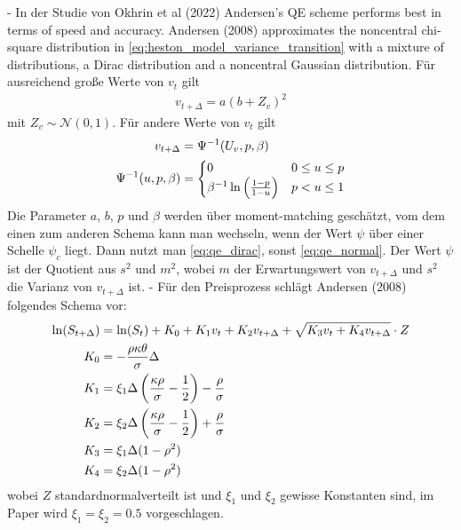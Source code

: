 - In der Studie von Okhrin et al (2022) Andersen's QE scheme performs best in terms of speed and accuracy. Andersen (2008) approximates the noncentral chi-square distribution in \eqref{eq:heston_model_variance_transition} with a mixture of distributions, a Dirac distribution and a noncentral Gaussian distribution. Für ausreichend große Werte von $v_t$ gilt
\begin{align}
    \label{eq:qe_normal}
    v_{t+\Delta} = a(b+Z_v)^2
\end{align}
mit $Z_v\sim\mathcal{N}(0,1)$. Für andere Werte von $v_t$ gilt
\begin{align}
    \label{eq:qe_dirac}
    v_{t+\Delta} &= \Psi^{-1}(U_v, p, \beta) \\
    \Psi^{-1}(u,p,\beta) &= \begin{cases}
        0 & 0\le u\le p \\
        \beta^{-1}\ln\left(\frac{1-p}{1-u}\right) & p<u\le 1
    \end{cases} \notag
\end{align}
Die Parameter $a$, $b$, $p$ und $\beta$ werden über moment-matching geschätzt, vom dem einen zum anderen Schema kann man wechseln, wenn der Wert $\psi$ über einer Schelle $\psi_c$ liegt. Dann nutzt man \eqref{eq:qe_dirac}, sonst \eqref{eq:qe_normal}. Der Wert $\psi$ ist der Quotient aus $s^2$ und $m^2$, wobei $m$ der Erwartungswert von $v_{t+\Delta}$ und $s^2$ die Varianz von $v_{t+\Delta}$ ist.
- Für den Preisprozess schlägt Andersen (2008) folgendes Schema vor:
\begin{align}
    \ln(S_{t+\Delta}) &= \ln(S_t) + K_0 + K_1v_t + K_2v_{t+\Delta} + \sqrt{K_3v_t + K_4v_{t+\Delta}}\cdot Z \notag \\
    K_0 &= -\frac{\rho\kappa\theta}{\sigma}\Delta \notag \\
    K_1 &= \xi_1\Delta\left(\frac{\kappa\rho}{\sigma} - \frac{1}{2}\right)-\frac{\rho}{\sigma} \notag \\
    K_2 &= \xi_2\Delta\left(\frac{\kappa\rho}{\sigma}-\frac{1}{2}\right)+\frac{\rho}{\sigma} \notag \\
    K_3 &= \xi_1\Delta(1-\rho^2) \notag \\
    K_4 &= \xi_2\Delta(1-\rho^2) \notag
\end{align}
wobei $Z$ standardnormalverteilt ist und $\xi_1$ und $\xi_2$ gewisse Konstanten sind, im Paper wird $\xi_1=\xi_2=0.5$ vorgeschlagen.